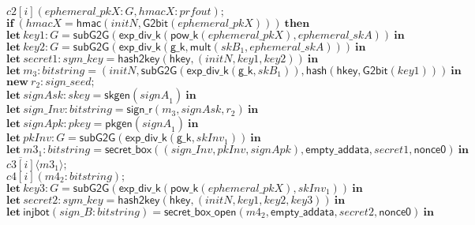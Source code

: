 \documentclass{article}
\newcommand{\cinput}[2]{{#1}({#2})}
\newcommand{\coutput}[2]{\overline{#1}\langle{#2}\rangle}
\newcommand{\kw}[1]{\mathbf{#1}}
\newcommand{\kwf}[1]{\mathsf{#1}}
\newcommand{\var}[1]{\mathit{#1}}
\newcommand{\kwt}[1]{\mathit{#1}}
\newcommand{\kwc}[1]{\mathit{#1}}
\begin{document}
\begin{tabbing}
\>$\quad \cinput{\kwc{c2}[\var{i}]}{\var{ephemeral{\_}pkX}: \kwt{G}, \var{hmacX}: \kwt{prfout}};$\\
\>$\quad \kw{if}\ (\var{hmacX}  =  \kwf{hmac}(\var{initN}, \kwf{G2bit}(\var{ephemeral{\_}pkX})))\ \kw{then}$\\
\>$\quad \kw{let}\ \var{key1}: \kwt{G} = \kwf{subG2G}(\kwf{exp{\_}div{\_}k}(\kwf{pow{\_}k}(\var{ephemeral{\_}pkX}), \var{ephemeral{\_}skA}))\ \kw{in}$\\
\>$\quad \kw{let}\ \var{key2}: \kwt{G} = \kwf{subG2G}(\kwf{exp{\_}div{\_}k}(\kwf{g{\_}k}, \kwf{mult}(\var{skB}_{1}, \var{ephemeral{\_}skA})))\ \kw{in}$\\
\>$\quad \kw{let}\ \var{secret1}: \kwt{sym{\_}key} = \kwf{hash2key}(\kwf{hkey}, \kwf{}(\var{initN}, \var{key1}, \var{key2}))\ \kw{in}$\\
\>$\quad \kw{let}\ \var{m}_{3}: \kwt{bitstring} = \kwf{}(\var{initN}, \kwf{subG2G}(\kwf{exp{\_}div{\_}k}(\kwf{g{\_}k}, \var{skB}_{1})), \kwf{hash}(\kwf{hkey}, \kwf{G2bit}(\var{key1})))\ \kw{in}$\\
\>$\quad \kw{new}\ \var{r}_{2}: \kwt{sign{\_}seed};$\\
\>$\quad \kw{let}\ \var{signAsk}: \kwt{skey} = \kwf{skgen}(\var{signA}_{1})\ \kw{in}$\\
\>$\quad \kw{let}\ \var{sign{\_}Inv}: \kwt{bitstring} = \kwf{sign{\_}r}(\var{m}_{3}, \var{signAsk}, \var{r}_{2})\ \kw{in}$\\
\>$\quad \kw{let}\ \var{signApk}: \kwt{pkey} = \kwf{pkgen}(\var{signA}_{1})\ \kw{in}$\\
\>$\quad \kw{let}\ \var{pkInv}: \kwt{G} = \kwf{subG2G}(\kwf{exp{\_}div{\_}k}(\kwf{g{\_}k}, \var{skInv}_{1}))\ \kw{in}$\\
\>$\quad \kw{let}\ \var{m3}_{1}: \kwt{bitstring} = \kwf{secret{\_}box}(\kwf{}(\var{sign{\_}Inv}, \var{pkInv}, \var{signApk}), \kwf{empty{\_}addata}, \var{secret1}, \kwf{nonce0})\ \kw{in}$\\
\>$\quad \coutput{\kwc{c3}[\var{i}]}{\var{m3}_{1}};$\\
\>$\quad \cinput{\kwc{c4}[\var{i}]}{\var{m4}_{2}: \kwt{bitstring}};$\\
\>$\quad \kw{let}\ \var{key3}: \kwt{G} = \kwf{subG2G}(\kwf{exp{\_}div{\_}k}(\kwf{pow{\_}k}(\var{ephemeral{\_}pkX}), \var{skInv}_{1}))\ \kw{in}$\\
\>$\quad \kw{let}\ \var{secret2}: \kwt{sym{\_}key} = \kwf{hash2key}(\kwf{hkey}, \kwf{}(\var{initN}, \var{key1}, \var{key2}, \var{key3}))\ \kw{in}$\\
\>$\quad \kw{let}\ \kwf{injbot}(\var{sign{\_}B}: \kwt{bitstring}) = \kwf{secret{\_}box{\_}open}(\var{m4}_{2}, \kwf{empty{\_}addata}, \var{secret2}, \kwf{nonce0})\ \kw{in}$\\

\end{tabbing}
\end{document}
